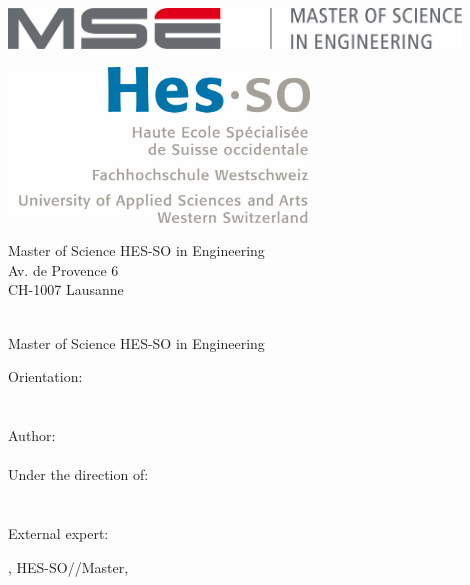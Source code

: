 
\begin{titlepage}
{\selectfont
	\begin{flushright}
		\begin{minipage}{0.5\textwidth}
			\begin{flushleft}
				\includegraphics[width=0.9\textwidth]{img/mse_logo}
			\end{flushleft}
		\end{minipage}%
		\begin{minipage}{0.5\textwidth}
			\begin{flushright}
				\includegraphics[width=0.6\textwidth]{img/hesso_logo}
			\end{flushright}
		\end{minipage}
		\begin{flushleft}
			\footnotesize
			Master of Science HES-SO in Engineering \\
			Av. de Provence 6 \\
			CH-1007 Lausanne
		\end{flushleft}
		~\\[0.5cm]
		
		{
		\Huge Master of Science HES-SO in Engineering\\[0.5cm]
		}
		
		{
		\LARGE Orientation: \Orientation\\[0.5cm]
		~\\[1cm]
		}
		{
			\Huge
			\ThesisTitle \\[1.5cm]
		}
		{
			\large
			Author:\\[-0.3cm]
			\Huge \Author \\[0.8cm]
		}
		{
			\large
			Under the direction of: \\
			\Advisor \\
			\AdvisorResearchUnit \\[0.5cm]
		}
		{
			\large
			External expert: \\
			\Expert
		}
		\vfill
		
		{\large \Place, HES-SO//Master, \Date}
		
	\end{flushright}
}
\restoregeometry
\end{titlepage}



